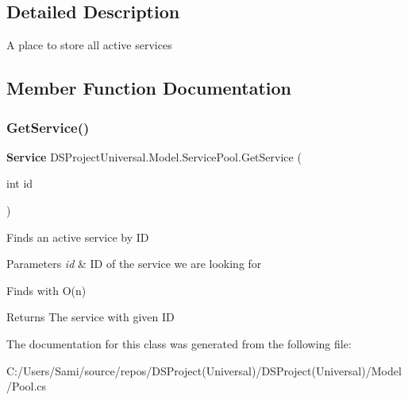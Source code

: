 \subsection{Detailed Description}
A place to store all active services

\subsection{Member Function Documentation}
\mbox{\label{class_d_s_project_universal_1_1_model_1_1_service_pool_ae63e3905a9b4396923ac8fa6792dd83d}} 
\subsubsection{Get\+Service()}
{\footnotesize\ttfamily \textbf{ Service} D\+S\+Project\+Universal.\+Model.\+Service\+Pool.\+Get\+Service (\begin{DoxyParamCaption}\item[{int}]{id }\end{DoxyParamCaption})}



Finds an active service by ID


\begin{DoxyParams}{Parameters}
{\em id} & ID of the service we are looking for\\
\hline
\end{DoxyParams}


Finds with O(n)

\begin{DoxyReturn}{Returns}
The service with given ID
\end{DoxyReturn}


The documentation for this class was generated from the following file\+:\begin{DoxyCompactItemize}
\item 
C\+:/\+Users/\+Sami/source/repos/\+D\+S\+Project(\+Universal)/\+D\+S\+Project(\+Universal)/\+Model/Pool.\+cs\end{DoxyCompactItemize}
